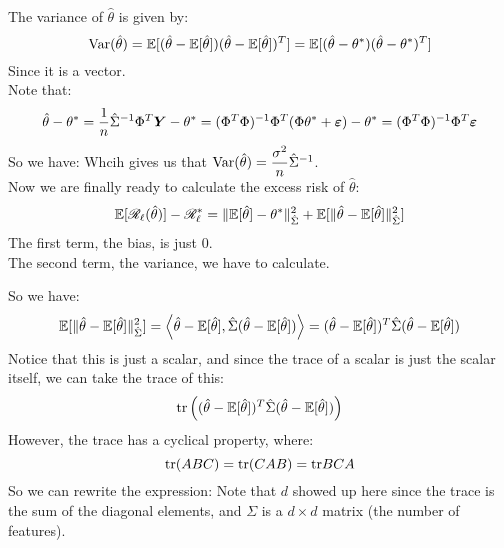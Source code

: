 \documentclass[12pt]{article}
\begin{document}
The variance of $\hat{\theta}$ is given by:
\[ \text{Var}(\hat{\theta})
= \mathbb{E}[(\hat{\theta} - \mathbb{E}[\hat{\theta}])
(\hat{\theta} - \mathbb{E}[\hat{\theta}])^T]
= \mathbb{E}[(\hat{\theta} - \theta^*)
(\hat{\theta} - \theta^*)^T] \]
Since it is a vector. \\
Note that:
\[ \hat{\theta} - \theta^*
= \dfrac{1}{n}\hat{\Sigma}^{-1} 
\Phi^T\boldsymbol{Y} - \theta^*
= (\Phi^T\Phi)^{-1} \Phi^T
(\Phi \theta^* + \boldsymbol{\varepsilon}) - \theta^*
= (\Phi^T\Phi)^{-1} \Phi^T \boldsymbol{\varepsilon} \]
So we have:
Whcih gives us that 
$\text{Var}(\hat{\theta}) 
= \dfrac{\sigma^2}{n}\hat{\Sigma}^{-1}$. \\

Now we are finally ready to 
calculate the excess risk of $\hat{\theta}$:
\[ \mathbb{E}[\mathscr{R}_{\ell}(\hat{\theta})] 
- \mathscr{R}_{\ell}^*
= \| \mathbb{E}[\hat{\theta}] - \theta^*
\|^2_{\hat{\Sigma}} +
\mathbb{E}[\|\hat{\theta} - \mathbb{E}[\hat{\theta}] 
\|^2_{\hat{\Sigma}}] \]
The first term, the bias, is just $0$. \\
The second term, the variance, we have to calculate.

So we have:
\[ \mathbb{E}[\|\hat{\theta} - \mathbb{E}[\hat{\theta}] 
\|^2_{\hat{\Sigma}}]
= \left\langle \hat{\theta} - \mathbb{E}[\hat{\theta}],
\hat{\Sigma}(\hat{\theta} - \mathbb{E}[\hat{\theta}]) \right\rangle
= (\hat{\theta} - \mathbb{E}[\hat{\theta}])^T
\hat{\Sigma}(\hat{\theta} - \mathbb{E}[\hat{\theta}]) \]
Notice that this is just a scalar,
and since the trace of a scalar is just the scalar
itself, we can take the trace of this:
\[ \text{tr}\left( (\hat{\theta} - \mathbb{E}[\hat{\theta}])^T
\hat{\Sigma}(\hat{\theta} - \mathbb{E}[\hat{\theta}]) \right)\]
However, the trace has a cyclical property,
where:
\[ \text{tr}(ABC) = \text{tr}(CAB) = \text{tr}{BCA} \]
So we can rewrite the expression:
Note that $d$ showed up here
since the trace is the sum of the diagonal
elements, and $\Sigma$
is a $d\times d$ matrix (the number of features). \\
\end{document}
